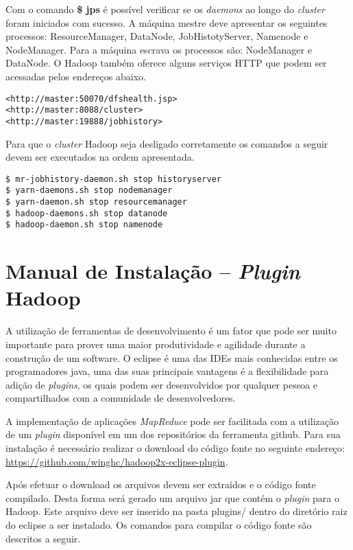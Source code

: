 \begin{apendicesenv}
Com o comando \textbf{\$ jps} é possível verificar se os \textit{daemons} ao longo do \textit{cluster} foram iniciados com sucesso. A máquina mestre deve apresentar os seguintes processos: ResourceManager, DataNode, JobHistotyServer, Namenode e NodeManager. Para a máquina escrava os processos são: NodeManager e DataNode. O Hadoop também oferece alguns serviços HTTP que podem ser acessadas pelos endereços abaixo.

\begin{lstlisting}[style=abnt,frame=single]
<http://master:50070/dfshealth.jsp>
<http://master:8088/cluster>
<http://master:19888/jobhistory>
\end{lstlisting}

Para que o \textit{cluster} Hadoop seja desligado corretamente os comandos a seguir devem ser executados na ordem apresentada.

\begin{lstlisting}[style=abnt,frame=single]
$ mr-jobhistory-daemon.sh stop historyserver 
$ yarn-daemons.sh stop nodemanager 
$ yarn-daemon.sh stop resourcemanager 
$ hadoop-daemons.sh stop datanode 
$ hadoop-daemon.sh stop namenode
\end{lstlisting}

\chapter{Manual de Instalação – \textit{Plugin} Hadoop}
\label{apd-eclipse}

A utilização de ferramentas de desenvolvimento é um fator que pode ser muito importante para prover uma maior produtividade e agilidade durante a construção de um software. O eclipse é uma das IDEs mais conhecidas entre os programadores java, uma das suas principais vantagens é a flexibilidade para adição de \textit{plugins}, os quais podem ser desenvolvidos por qualquer pessoa e compartilhados com a comunidade de desenvolvedores.

A implementação de aplicações \textit{MapReduce} pode ser facilitada com a utilização de um \textit{plugin} disponível em um dos repositórios da ferramenta github. Para sua instalação é necessário realizar o download do código fonte no seguinte endereço: \url{https://github.com/winghc/hadoop2x-eclipse-plugin}.

Após efetuar o download os arquivos devem ser extraídos e o código fonte compilado. Desta forma será gerado um arquivo jar que contém o \textit{plugin} para o Hadoop. Este arquivo deve ser inserido na pasta plugins/ dentro do diretório raiz do eclipse a ser instalado. Os comandos para compilar o código fonte são descritos a seguir.


\end{apendicesenv}

